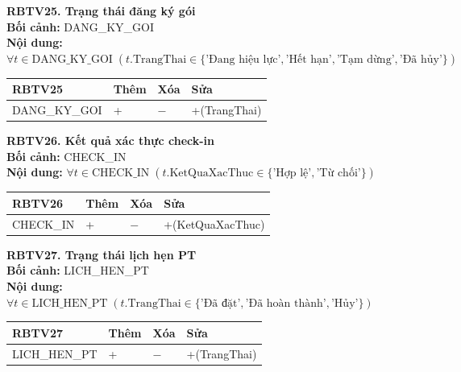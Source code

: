 \documentclass[11pt, a4paper]{article}
\begin{document}
\vspace{0.8em}
\textbf{RBTV25. Trạng thái đăng ký gói} \\
\textbf{Bối cảnh:} DANG\_KY\_GOI \\
\textbf{Nội dung:} $\forall t \in \text{DANG\_KY\_GOI} \; (t.\text{TrangThai} \in \{\text{'Đang hiệu lực'}, \text{'Hết hạn'}, \text{'Tạm dừng'}, \text{'Đã hủy'}\})$

\vspace{0.3em}
\begin{small}
\begin{tabularx}{\textwidth}{| C{4.2cm} | C{2cm} | C{2cm} | Y |}
\hline
\textbf{RBTV25} & \textbf{Thêm} & \textbf{Xóa} & \textbf{Sửa} \\
\hline
DANG\_KY\_GOI & + & $-$ & +(TrangThai) \\
\hline
\end{tabularx}
\end{small}

\vspace{0.8em}
\textbf{RBTV26. Kết quả xác thực check-in} \\
\textbf{Bối cảnh:} CHECK\_IN \\
\textbf{Nội dung:} $\forall t \in \text{CHECK\_IN} \; (t.\text{KetQuaXacThuc} \in \{\text{'Hợp lệ'}, \text{'Từ chối'}\})$

\vspace{0.3em}
\begin{small}
\begin{tabularx}{\textwidth}{| C{4.2cm} | C{2cm} | C{2cm} | Y |}
\hline
\textbf{RBTV26} & \textbf{Thêm} & \textbf{Xóa} & \textbf{Sửa} \\
\hline
CHECK\_IN & + & $-$ & +(KetQuaXacThuc) \\
\hline
\end{tabularx}
\end{small}

\vspace{0.8em}
\textbf{RBTV27. Trạng thái lịch hẹn PT} \\
\textbf{Bối cảnh:} LICH\_HEN\_PT \\
\textbf{Nội dung:} $\forall t \in \text{LICH\_HEN\_PT} \; (t.\text{TrangThai} \in \{\text{'Đã đặt'}, \text{'Đã hoàn thành'}, \text{'Hủy'}\})$

\vspace{0.3em}
\begin{small}
\begin{tabularx}{\textwidth}{| C{4.2cm} | C{2cm} | C{2cm} | Y |}
\hline
\textbf{RBTV27} & \textbf{Thêm} & \textbf{Xóa} & \textbf{Sửa} \\
\hline
LICH\_HEN\_PT & + & $-$ & +(TrangThai) \\
\hline
\end{tabularx}
\end{small}
\end{document}
